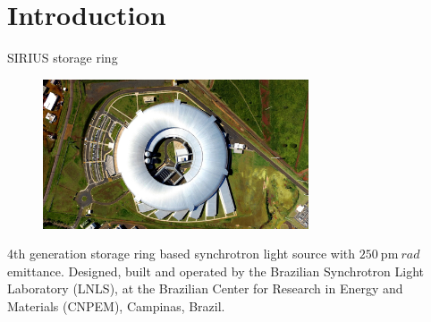 \documentclass[aspectratio=169]{beamer}
\begin{document}
\section{Introduction}
\begin{frame}{SIRIUS storage ring}
    \begin{minipage}{0.35\textwidth}
        \begin{figure}
            \centering
            \includegraphics[angle=90, width=0.7\textwidth]{f1.png}
        \end{figure}
    \end{minipage}
    \hfill
    \begin{minipage}{0.62\textwidth}
        \scriptsize
        4th generation storage ring based synchrotron light source with $250~\unit{\pico\meter~rad}$ emittance. Designed, built and operated by the Brazilian Synchrotron Light Laboratory (LNLS), at the Brazilian Center for Research in Energy and Materials (CNPEM), Campinas, Brazil.\\


\end{minipage}
\end{frame}
\end{document}
